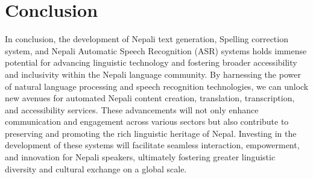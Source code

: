 \chapter[Conclusion]{Conclusion}

In conclusion, the development of Nepali text generation, Spelling correction system, and Nepali Automatic Speech Recognition (ASR) systems holds immense potential for advancing linguistic technology and fostering broader accessibility and inclusivity within the Nepali language community. By harnessing the power of natural language processing and speech recognition technologies, we can unlock new avenues for automated Nepali content creation, translation, transcription, and accessibility services. These advancements will not only enhance communication and engagement across various sectors but also contribute to preserving and promoting the rich linguistic heritage of Nepal. Investing in the development of these systems will facilitate seamless interaction, empowerment, and innovation for Nepali speakers, ultimately fostering greater linguistic diversity and cultural exchange on a global scale.





